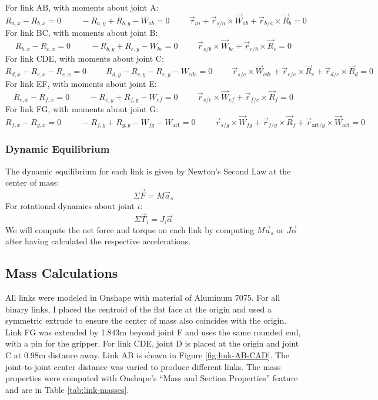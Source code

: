 \documentclass[12pt]{article}
\newcommand\hs{\hspace{1cm}}
\begin{document}
For link AB, with moments about joint A:
\[ R_{a,x} - R_{b,x} = 0 \hs -R_{a,y} + R_{b,y} - W_{ab} = 0 \hs \vec{\tau}_{in} + \vec{r}_{s/a}\times \vec{W}_{ab} + \vec{r}_{b/a}\times \vec{R}_{b} = 0 \]
For link BC, with moments about joint B:
\[ R_{b,x} - R_{c,x} = 0 \hs -R_{b,y} + R_{c,y} - W_{bc} = 0 \hs \vec{r}_{s/b}\times \vec{W}_{bc} + \vec{r}_{c/b}\times \vec{R}_{c} = 0 \]
For link CDE, with moments about joint C:
\[ R_{d,x} - R_{c,x} - R_{e,x} = 0 \hs R_{d,y} - R_{c,y} - R_{e,y} - W_{cde} = 0 \hs \vec{r}_{s/c}\times \vec{W}_{cde} + \vec{r}_{e/c}\times \vec{R}_{e} + \vec{r}_{d/c}\times \vec{R}_{d} = 0 \]
For link EF, with moments about joint E:
\[ R_{e,x} - R_{f,x} = 0 \hs -R_{e,y} + R_{f,y} - W_{ef} = 0 \hs \vec{r}_{s/e}\times \vec{W}_{ef} + \vec{r}_{f/e}\times \vec{R}_{f} = 0 \]
For link FG, with moments about joint G:
\[ R_{f,x} - R_{g,x} = 0 \hs -R_{f,y} + R_{g,y} - W_{fg} - W_{\text{art}} = 0 \hs \vec{r}_{s/g}\times \vec{W}_{fg} + \vec{r}_{f/g}\times \vec{R}_{f} + \vec{r}_{\text{art}/g}\times \vec{W}_{\text{art}} = 0 \]

\subsubsection{Dynamic Equilibrium}%
\label{eqns.forces-moments.dynamic}

The dynamic equilibrium for each link is given by Newton's Second Law at the center of mass:
\[ \Sigma \vec{F} = M \vec{a}_{s} \]
For rotational dynamics about joint $i$:
\[ \Sigma \vec{T}_{i} = J_{i} \vec{\alpha} \]
We will compute the net force and torque on each link by computing $M \vec{a}_{s}$ or $J \vec{\alpha}$ after having calculated the respective accelerations.

\subsection{Mass Calculations}%
\label{eqns.masses}

All links were modeled in Onshape with material of Aluminum 7075. For all binary links, I placed the centroid of the flat face at the origin and used a symmetric extrude to ensure the center of mass also coincides with the origin. Link FG was extended by 1.843m beyond joint F and uses the same rounded end, with a pin for the gripper. For link CDE, joint D is placed at the origin and joint C at 0.98m distance away.  Link AB is shown in Figure \ref{fig:link-AB-CAD}. The joint-to-joint center distance was varied to produce different links. The mass properties were computed with Onshape's ``Mass and Section Properties'' feature and are in Table \ref{tab:link-masses}.
\end{document}
